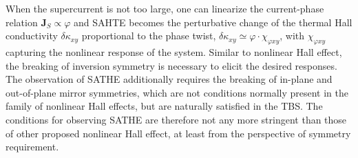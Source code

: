 When the supercurrent is not too large, one can linearize the current-phase relation $\bm J_S \propto\varphi$ and SAHTE becomes the perturbative change of the thermal Hall conductivity $\delta \kappa_{xy}$ proportional to the phase twist, $\delta\kappa_{xy}\simeq\varphi\cdot\chi_{\varphi xy}$, with $\chi_{\varphi xy}$ capturing the nonlinear response of the system. Similar to nonlinear Hall effect, the breaking of inversion symmetry is necessary to elicit the desired responses. The observation of SATHE additionally requires the breaking of in-plane and out-of-plane mirror symmetries, which are not conditions normally present in the family of nonlinear Hall effects, but are naturally satisfied in the TBS. The conditions for observing SATHE are therefore not any more stringent than those of other proposed nonlinear Hall effect, at least from the perspective of symmetry requirement. 

